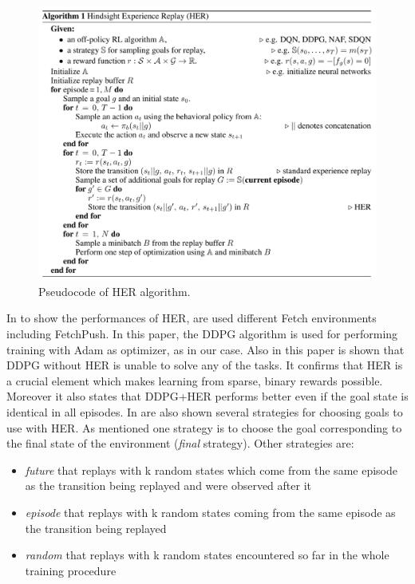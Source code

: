 \documentclass[a4paper]{report}
\begin{document}
\begin{figure}[h!]
\centering
\includegraphics[scale=0.5]{her.png}
\caption{\label{Fig: her} Pseudocode of HER algorithm.}
\end{figure}

In \cite{her} to show the performances of HER, are used different Fetch environments including FetchPush. In this paper, the DDPG algorithm is used for performing training with Adam as optimizer, as in our case. Also in this paper is shown that DDPG without HER is unable to solve any of the tasks. It confirms that HER is a crucial element which makes learning from sparse, binary rewards possible. Moreover it also states that DDPG+HER performs better even if the goal state is identical in all episodes. In \cite{her} are also shown several strategies for choosing goals to use with HER. As mentioned one strategy is to choose the goal corresponding to the final state of the environment (\textit{final} strategy). Other strategies are:
\begin{itemize}
\item \textit{future} that replays with k random states which come from the same episode as the transition being replayed and were observed after it
\item \textit{episode} that replays with k random states coming from the same episode as the transition being replayed
\item \textit{random} that replays with k random states encountered so far in the whole training procedure
\end{itemize}
\end{document}
